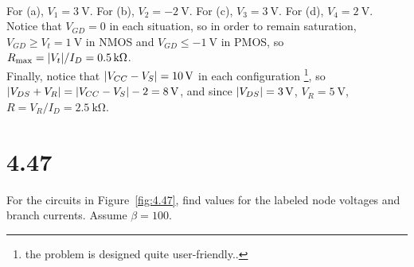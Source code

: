 \documentclass[12pt, a4paper]{article}
\begin{document}
\Ans \\
For (a), $V_1 = \SI{3}{\V}$. For (b), $V_2 = \SI{-2}{\V}$. For (c), $V_3 = \SI{3}{\V}$. For (d), $V_4 = \SI{2}{\V}$.  \\
Notice that $V_{GD} = 0$ in each situation, so in order to remain saturation, $V_{GD} \geq V_t = \SI{1}{\V}$ in NMOS and $V_{GD} \leq \SI{-1}{\V}$ in PMOS, so $R_{\text{max}} = \abs{V_t} / I_D = \SI{0.5}{\kohm}$. \\
Finally, notice that $\abs{V_{CC} - V_{S}} = \SI{10}{\V}$ in each configuration \footnote{the problem is designed quite user-friendly..}, so $\abs{V_{DS} + V_R} = \abs{V_{CC} - V_{S}} - 2 = \SI{8}{\V}$, and since $\abs{V_{DS}} = \SI{3}{\V}$, $V_R = \SI{5}{\V}$, $R = V_R / I_D = \SI{2.5}{\kohm}$.

\section{4.47}
For the circuits in Figure~\ref{fig:4.47}, find values for the labeled node voltages and branch currents. Assume $\beta = 100$.
\end{document}
